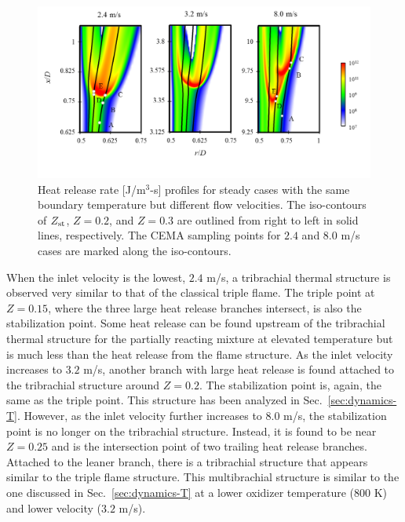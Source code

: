 \begin{figure}[t]
  \centering
  \scriptsize
  \includegraphics[width=1.0\textwidth]{ch-dynamics/HRR_V.png}
  \vspace{-0.3in}
  \normalsize
  \caption{Heat release rate [J/m$^3$-s] profiles for steady cases with the same boundary temperature but different flow velocities.  The iso-contours of $Z_{\rm st}$, $Z = 0.2$, and $Z = 0.3$ are outlined from right to left in solid lines, respectively.  The CEMA sampling points for $2.4$ and $8.0$ m/s cases are marked along the iso-contours.}
  \label{fig:HRR_V}
\end{figure}

When the inlet velocity is the lowest, $2.4$ m/s, a tribrachial thermal structure is observed very similar to that of the classical triple flame.  The triple point at $Z = 0.15$, where the three large heat release branches intersect, is also the stabilization point.  Some heat release can be found upstream of the tribrachial thermal structure for the partially reacting mixture at elevated temperature but is much less than the heat release from the flame structure.  As the inlet velocity increases to $3.2$ m/s, another branch with large heat release is found attached to the tribrachial structure around $Z = 0.2$.  The stabilization point is, again, the same as the triple point.  This structure has been analyzed in Sec.~\ref{sec:dynamics-T}.  However, as the inlet velocity further increases to $8.0$ m/s, the stabilization point is no longer on the tribrachial structure.  Instead, it is found to be near $Z = 0.25$ and is the intersection point of two trailing heat release branches.  Attached to the leaner branch, there is a tribrachial structure that appears similar to the triple flame structure.  This multibrachial structure is similar to the one discussed in Sec.~\ref{sec:dynamics-T} at a lower oxidizer temperature ($800$ K) and lower velocity ($3.2$ m/s).

